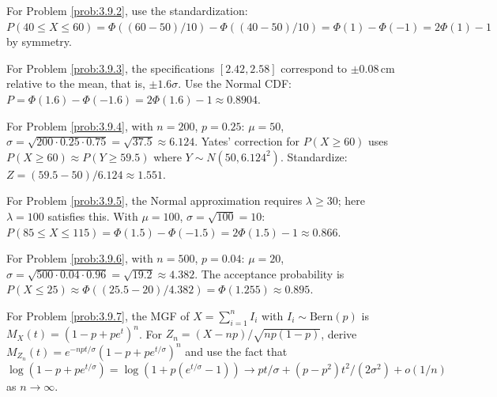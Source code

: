 \begin{sugerencia}
	\label{sug:3.9.2}
	For Problem \ref{prob:3.9.2}, use the standardization: $P(40 \le X \le 60) = \Phi((60-50)/10) - \Phi((40-50)/10) = \Phi(1) - \Phi(-1) = 2\Phi(1) - 1$ by symmetry.
\end{sugerencia}

\begin{sugerencia}
	\label{sug:3.9.3}
	For Problem \ref{prob:3.9.3}, the specifications $[2.42, 2.58]$ correspond to $\pm 0.08\,\text{cm}$ relative to the mean, that is, $\pm 1.6\sigma$. Use the Normal CDF: $P = \Phi(1.6) - \Phi(-1.6) = 2\Phi(1.6) - 1 \approx 0.8904$.
\end{sugerencia}

\begin{sugerencia}
	\label{sug:3.9.4}
	For Problem \ref{prob:3.9.4}, with $n = 200$, $p = 0.25$: $\mu = 50$, $\sigma = \sqrt{200 \cdot 0.25 \cdot 0.75} = \sqrt{37.5} \approx 6.124$. Yates' correction for $P(X \ge 60)$ uses $P(X \ge 60) \approx P(Y \ge 59.5)$ where $Y \sim N(50, 6.124^{2})$. Standardize: $Z = (59.5 - 50)/6.124 \approx 1.551$.
\end{sugerencia}

\begin{sugerencia}
	\label{sug:3.9.5}
	For Problem \ref{prob:3.9.5}, the Normal approximation requires $\lambda \ge 30$; here $\lambda = 100$ satisfies this. With $\mu = 100$, $\sigma = \sqrt{100} = 10$: $P(85 \le X \le 115) = \Phi(1.5) - \Phi(-1.5) = 2\Phi(1.5) - 1 \approx 0.866$.
\end{sugerencia}

\begin{sugerencia}
	\label{sug:3.9.6}
	For Problem \ref{prob:3.9.6}, with $n = 500$, $p = 0.04$: $\mu = 20$, $\sigma = \sqrt{500 \cdot 0.04 \cdot 0.96} = \sqrt{19.2} \approx 4.382$. The acceptance probability is $P(X \le 25) \approx \Phi((25.5 - 20)/4.382) = \Phi(1.255) \approx 0.895$.
\end{sugerencia}

\begin{sugerencia}
	\label{sug:3.9.7}
	For Problem \ref{prob:3.9.7}, the MGF of $X = \sum_{i=1}^{n} I_{i}$ with $I_{i} \sim \text{Bern}(p)$ is $M_{X}(t) = (1 - p + p e^{t})^{n}$. For $Z_{n} = (X - np)/\sqrt{np(1-p)}$, derive $M_{Z_{n}}(t) = e^{-npt/\sigma} (1 - p + p e^{t/\sigma})^{n}$ and use the fact that $\log(1 - p + p e^{t/\sigma}) = \log(1 + p(e^{t/\sigma} - 1)) \to pt/\sigma + (p - p^{2})t^{2}/(2\sigma^{2}) + o(1/n)$ as $n \to \infty$.
\end{sugerencia}

